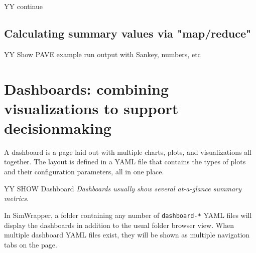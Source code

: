 YY continue





\hypertarget{calculation-tables-map-reduce}{%
\subsection{Calculating summary values via "map/reduce"}\label{calculation-tables-map-reduce}}



YY Show PAVE example run output with Sankey, numbers, etc


\hypertarget{dashboards-combining-visualizations-to-support-decisionmaking}{%
\section{Dashboards: combining visualizations to support
decisionmaking}\label{dashboards-combining-visualizations-to-support-decisionmaking}}

A dashboard is a page laid out with multiple charts, plots, and
visualizations all together. The layout is defined in a YAML file that
contains the types of plots and their configuration parameters, all in
one place.

YY SHOW Dashboard \emph{Dashboards usually show several at-a-glance
summary metrics.}

In SimWrapper, a folder containing any number of \texttt{dashboard-*}
YAML files will display the dashboards in addition to the usual folder
browser view. When multiple dashboard YAML files exist, they will be
shown as multiple navigation tabs on the page.

